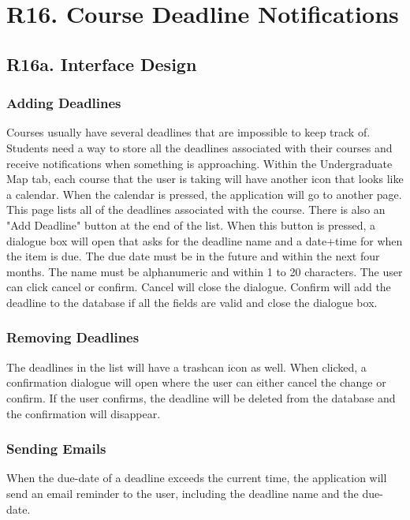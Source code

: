 \documentclass[12pt, a4paper]{article}
\begin{document}
\section*{R16. Course Deadline Notifications}
\label{sec:R16}
\subsection*{R16a. Interface Design}
\subsubsection*{Adding Deadlines}
Courses usually have several deadlines that are impossible to keep track of. Students need a way to store all the deadlines associated with their courses and receive notifications when something is approaching. Within the Undergraduate Map tab, each course that the user is taking will have another icon that looks like a calendar. When the calendar is pressed, the application will go to another page. This page lists all of the deadlines associated with the course. There is also an "Add Deadline" button at the end of the list. When this button is pressed, a dialogue box will open that asks for the deadline name and a date+time for when the item is due. The due date must be in the future and within the next four months. The name must be alphanumeric and within 1 to 20 characters. The user can click cancel or confirm. Cancel will close the dialogue. Confirm will add the deadline to the database if all the fields are valid and close the dialogue box. 
\subsubsection*{Removing Deadlines}
The deadlines in the list will have a trashcan icon as well. When clicked, a confirmation dialogue will open where the user can either cancel the change or confirm. If the user confirms, the deadline will be deleted from the database and the confirmation will disappear.
\subsubsection*{Sending Emails}
When the due-date of a deadline exceeds the current time, the application will send an email reminder to the user, including the deadline name and the due-date.
\end{document}

